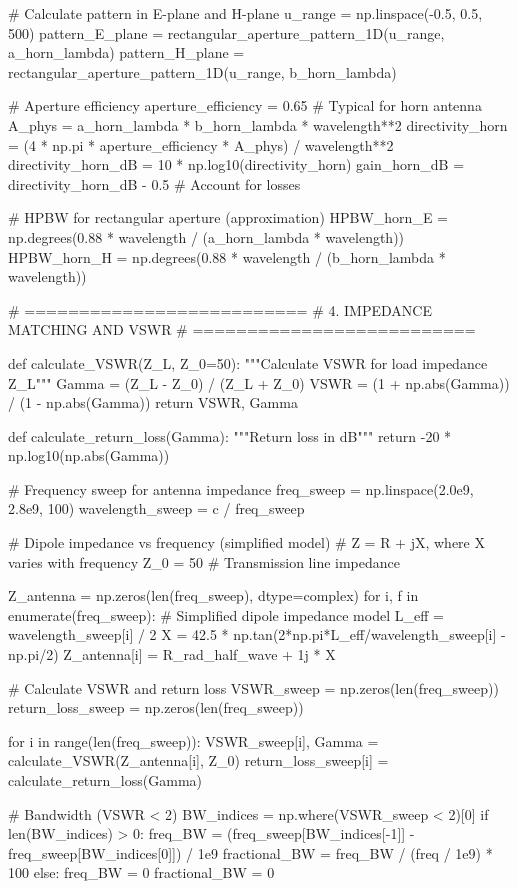 \documentclass[a4paper, 11pt]{article}
\begin{document}
\begin{pycode}
# Calculate pattern in E-plane and H-plane
u_range = np.linspace(-0.5, 0.5, 500)
pattern_E_plane = rectangular_aperture_pattern_1D(u_range, a_horn_lambda)
pattern_H_plane = rectangular_aperture_pattern_1D(u_range, b_horn_lambda)

# Aperture efficiency
aperture_efficiency = 0.65  # Typical for horn antenna
A_phys = a_horn_lambda * b_horn_lambda * wavelength**2
directivity_horn = (4 * np.pi * aperture_efficiency * A_phys) / wavelength**2
directivity_horn_dB = 10 * np.log10(directivity_horn)
gain_horn_dB = directivity_horn_dB - 0.5  # Account for losses

# HPBW for rectangular aperture (approximation)
HPBW_horn_E = np.degrees(0.88 * wavelength / (a_horn_lambda * wavelength))
HPBW_horn_H = np.degrees(0.88 * wavelength / (b_horn_lambda * wavelength))

# ==========================
# 4. IMPEDANCE MATCHING AND VSWR
# ==========================

def calculate_VSWR(Z_L, Z_0=50):
    """Calculate VSWR for load impedance Z_L"""
    Gamma = (Z_L - Z_0) / (Z_L + Z_0)
    VSWR = (1 + np.abs(Gamma)) / (1 - np.abs(Gamma))
    return VSWR, Gamma

def calculate_return_loss(Gamma):
    """Return loss in dB"""
    return -20 * np.log10(np.abs(Gamma))

# Frequency sweep for antenna impedance
freq_sweep = np.linspace(2.0e9, 2.8e9, 100)
wavelength_sweep = c / freq_sweep

# Dipole impedance vs frequency (simplified model)
# Z = R + jX, where X varies with frequency
Z_0 = 50  # Transmission line impedance

Z_antenna = np.zeros(len(freq_sweep), dtype=complex)
for i, f in enumerate(freq_sweep):
    # Simplified dipole impedance model
    L_eff = wavelength_sweep[i] / 2
    X = 42.5 * np.tan(2*np.pi*L_eff/wavelength_sweep[i] - np.pi/2)
    Z_antenna[i] = R_rad_half_wave + 1j * X

# Calculate VSWR and return loss
VSWR_sweep = np.zeros(len(freq_sweep))
return_loss_sweep = np.zeros(len(freq_sweep))

for i in range(len(freq_sweep)):
    VSWR_sweep[i], Gamma = calculate_VSWR(Z_antenna[i], Z_0)
    return_loss_sweep[i] = calculate_return_loss(Gamma)

# Bandwidth (VSWR < 2)
BW_indices = np.where(VSWR_sweep < 2)[0]
if len(BW_indices) > 0:
    freq_BW = (freq_sweep[BW_indices[-1]] - freq_sweep[BW_indices[0]]) / 1e9
    fractional_BW = freq_BW / (freq / 1e9) * 100
else:
    freq_BW = 0
    fractional_BW = 0


\end{pycode}
\end{document}
